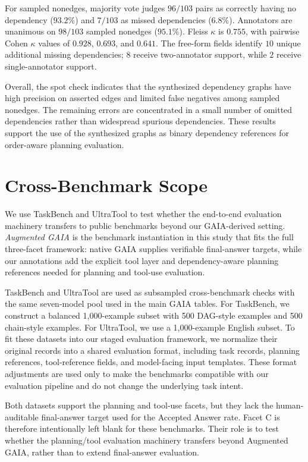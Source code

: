 \documentclass{article}
\begin{document}
For sampled nonedges, majority vote judges \(96/103\) pairs as correctly having
no dependency (\(93.2\%\)) and \(7/103\) as missed dependencies (\(6.8\%\)).
Annotators are unanimous on \(98/103\) sampled nonedges (\(95.1\%\)). Fleiss
\(\kappa\) is \(0.755\), with pairwise Cohen \(\kappa\) values of \(0.928\),
\(0.693\), and \(0.641\). The free-form fields identify \(10\) unique additional
missing dependencies; \(8\) receive two-annotator support, while \(2\) receive
single-annotator support.

Overall, the spot check indicates that the synthesized dependency graphs have
high precision on asserted edges and limited false negatives among sampled
nonedges. The remaining errors are concentrated in a small number of omitted
dependencies rather than widespread spurious dependencies. These results support
the use of the synthesized graphs as binary dependency references for
order-aware planning evaluation.

\FloatBarrier
\section{Cross-Benchmark Scope}
\label{sec:appendix-cross-benchmark}

We use TaskBench and UltraTool to test whether the end-to-end evaluation
machinery transfers to public benchmarks beyond our GAIA-derived setting.
\emph{Augmented GAIA} is the benchmark instantiation in this study that fits the
full three-facet framework: native GAIA supplies verifiable final-answer targets,
while our annotations add the explicit tool layer and dependency-aware planning
references needed for planning and tool-use evaluation.

TaskBench and UltraTool are used as subsampled cross-benchmark checks with the
same seven-model pool used in the main GAIA tables. For TaskBench, we construct
a balanced 1{,}000-example subset with 500 DAG-style examples and 500
chain-style examples. For UltraTool, we use a 1{,}000-example English subset.
To fit these datasets into our staged evaluation framework, we normalize their
original records into a shared evaluation format, including task records,
planning references, tool-reference fields, and model-facing input templates.
These format adjustments are used only to make the benchmarks compatible with
our evaluation pipeline and do not change the underlying task intent.

Both datasets support the planning and tool-use facets, but they lack the
human-auditable final-answer target used for the Accepted Answer rate.
Facet C is therefore intentionally left blank for these benchmarks. Their role
is to test whether the planning/tool evaluation machinery transfers beyond
Augmented GAIA, rather than to extend final-answer evaluation.
\end{document}
